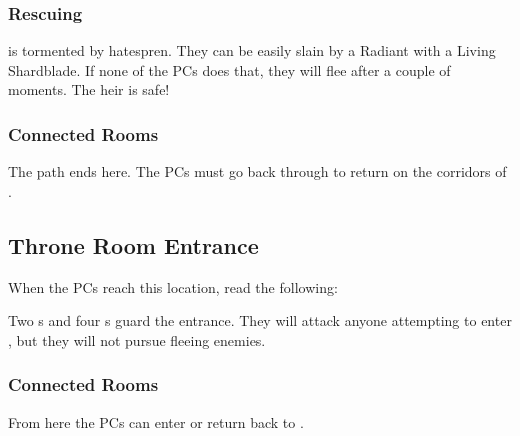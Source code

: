 
\subsubsection{Rescuing \npcGavinor{}}

\npcGavinor{} is tormented by hatespren. They can be easily slain by a Radiant with a Living Shardblade. If none of the PCs does that, they will flee after a couple of moments. The heir is safe!



\subsubsection{Connected Rooms}

The path ends here. The PCs must go back through  to return on the corridors of .




\subsection{Throne Room Entrance}
\label{ssec:kholinarPalaceRoomsThroneRoomEntrance}

When the PCs reach this location, read the following:


Two \enemyQueensGuardLeader{}s and four \enemyQueensGuard{}s guard the entrance. They will attack anyone attempting to enter , but they will not pursue fleeing enemies.

\subsubsection{Connected Rooms}

From here the PCs can enter  or return back to .




